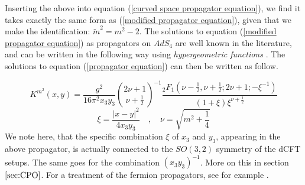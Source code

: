 %
%
Inserting the above into equation (\ref{curved space propagator equation}), we find it takes exactly the same form as (\ref{modified propagator equation}), given that we make the identification: $\tilde{m}^2 = m^2 - 2$. The solutions to equation (\ref{modified propagator equation}) as propagators on $AdS_4$ are well known in the literature, and can be written in the following way using \textit{hypergeometric functions} \cite{Two-point functions in D5-D3}. The solutions to equation (\ref{propagator equation}) can then be written as follow.

\newpage
%
%
\begin{equation}
K^{m^2}(x,y)
=
\frac{g^2}{16 \pi^2 x_3 y_3}
\binom{2 \nu + 1}{\nu + \frac{1}{2}}^{-1}
\frac{{}_2F_1 \left(
\nu - \frac{1}{2}, \nu + \frac{1}{2}; 2 \nu + 1; -\xi^{-1}
\right) }
{(1 + \xi) \xi^{\nu + \frac{1}{2}} }
\end{equation}
%
%
\begin{equation}
\xi = \frac{|x-y|^2}{4 x_3 y_3}
%
\quad , \quad
%
\nu = \sqrt{m^2 + \frac{1}{4}}
\end{equation}
%
%
We note here, that the specific combination $\xi$ of $x_3$ and $y_3$, appearing in the above propagator, is actually connected to the $SO(3,2)$ symmetry of the dCFT setups. The same goes for the combination $(x_3 y_3)^{-1}$. More on this in section $\ref{sec:CPO}$. For a treatment of the fermion propagators, see for example \cite{One-point functions in D5-D3}.



